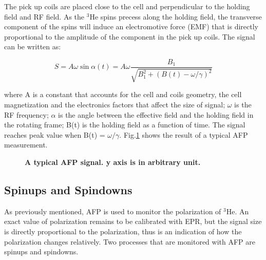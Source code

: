 The pick up coils are placed close to the cell and perpendicular to the holding field and RF field. As the $^{3}$He spins precess along the holding field, the transverse component of the spins will induce an electromotive force (EMF) that is directly proportional to the amplitude of the component in the pick up coils. The signal can be written as:

\begin{equation}
S=A\omega \sin{\alpha(t)}=A\omega \frac{B_{1}}{\sqrt{B_{1}^{2}+(B(t)-\omega/\gamma)^{2}}}
\end{equation}

where A is a constant that accounts for the cell and coils geometry, the cell magnetization and the electronics factors that affect the size of signal; $\omega$ is the RF frequency; $\alpha$ is the angle between the effective field and the holding field in the rotating frame; B(t) is the holding field as a function of time. The signal reaches peak value when B(t) = $\omega/\gamma$. Fig.\ref{AFPSignal} shows the result of a typical AFP measurement.

\begin{figure}[H]\label{AFPSignal}
	\centering
	\caption{{\bf A typical AFP signal. y axis is in arbitrary unit.}}
	\label{AFPSignal}
\end{figure}

\subsection{Spinups and Spindowns}

As previously mentioned, AFP is used to monitor the polarization of $^{3}$He. An exact value of polarization remains to be calibrated with EPR, but the signal size is directly proportional to the polarization, thus is an indication of how the polarization changes relatively. Two processes that are monitored with AFP are spinups and spindowns. 

